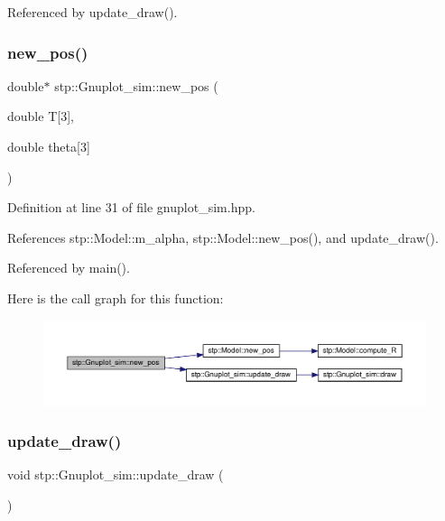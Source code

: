 Referenced by update\+\_\+draw().

\mbox{\label{classstp_1_1_gnuplot__sim_a510b50f1120459f9eb7684f249ed58ca}} 
\subsubsection{\texorpdfstring{new\+\_\+pos()}{new\_pos()}}
{\footnotesize\ttfamily double$\ast$ stp\+::\+Gnuplot\+\_\+sim\+::new\+\_\+pos (\begin{DoxyParamCaption}\item[{double}]{T\mbox{[}3\mbox{]},  }\item[{double}]{theta\mbox{[}3\mbox{]} }\end{DoxyParamCaption})\hspace{0.3cm}{\ttfamily [inline]}}



Definition at line 31 of file gnuplot\+\_\+sim.\+hpp.



References stp\+::\+Model\+::m\+\_\+alpha, stp\+::\+Model\+::new\+\_\+pos(), and update\+\_\+draw().



Referenced by main().

Here is the call graph for this function\+:\nopagebreak
\begin{figure}[H]
\begin{center}
\leavevmode
\includegraphics[width=350pt]{classstp_1_1_gnuplot__sim_a510b50f1120459f9eb7684f249ed58ca_cgraph}
\end{center}
\end{figure}
\mbox{\label{classstp_1_1_gnuplot__sim_a22d1793e471b78033080650a3701d2c4}} 
\subsubsection{\texorpdfstring{update\+\_\+draw()}{update\_draw()}}
{\footnotesize\ttfamily void stp\+::\+Gnuplot\+\_\+sim\+::update\+\_\+draw (\begin{DoxyParamCaption}{ }\end{DoxyParamCaption})\hspace{0.3cm}{\ttfamily [inline]}}



